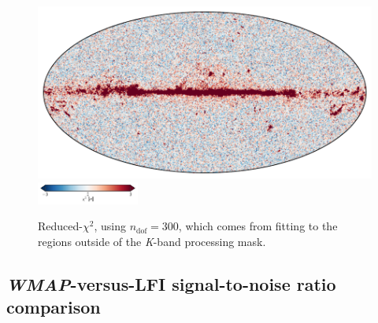 \documentclass[twocolumn]{../../common/aa}
\def\WMAP{\emph{WMAP}}
\newcommand{\K}[0]{\textit K}
\begin{document}
\begin{figure}
	\centering
	\includegraphics[width=\linewidth]{figures/chisq_IQU.pdf}
	\newline
	\includegraphics[width=0.3\textwidth]{figures/cbar_3sigma.pdf}
	\caption{Reduced-$\chi^2$, using $n_\mathrm{dof}=300$, which comes from fitting to the regions outside of the \K-band processing mask.}\label{fig:reduced_chisq}
\end{figure}


\subsection{\WMAP-versus-LFI signal-to-noise ratio comparison}
\label{sec:s2n}
\end{document}
